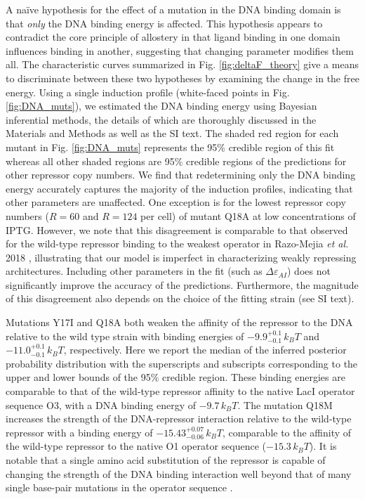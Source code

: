 A na\"{i}ve hypothesis for the effect of a mutation in the DNA binding domain is that
\textit{only} the DNA binding energy is affected. This hypothesis appears to
contradict the core principle of allostery in that ligand binding in one domain
influences binding in another, suggesting that changing
 parameter modifies them all. The characteristic curves summarized in Fig.
\ref{fig:deltaF_theory} give a means to  discriminate between these two
hypotheses by examining the change in the free energy. Using a single induction profile
(white-faced points in Fig. \ref{fig:DNA_muts}), we estimated the DNA binding
energy using Bayesian inferential methods, the details of which are thoroughly discussed in the Materials and Methods as
well as the SI text. The shaded red region for each mutant in Fig.
\ref{fig:DNA_muts} represents the 95\% credible region of this fit whereas
all other shaded regions are 95\% credible regions of the predictions for other repressor copy
numbers. We find that redetermining only the DNA binding energy accurately
captures the majority of the induction profiles, indicating that other parameters
are unaffected. One exception is for the lowest
repressor copy numbers ($R = 60$ and $R=124$ per cell) of mutant Q18A
at low concentrations of IPTG. However, we note that this disagreement is
comparable to that observed for the wild-type repressor binding to the weakest
operator in Razo-Mejia \textit{et al.} 2018 \cite{Razo-Mejia2018}, illustrating that
our model is imperfect in characterizing weakly repressing architectures.
Including other parameters in the fit (such as $\Delta\varepsilon_{AI}$) does
not significantly improve the accuracy of the predictions. Furthermore, the magnitude of
this disagreement also depends on the choice of the fitting strain (see SI
text).


Mutations Y17I and Q18A both weaken the affinity of the repressor to the DNA 
relative to the wild type strain with binding energies of $-9.9 ^{+0.1}_{-0.1}\, k_BT$ and
$-11.0^{+0.1}_{-0.1}\, k_BT$, respectively. Here we report the median of the
inferred posterior probability distribution with the superscripts and subscripts
corresponding to the upper and lower bounds of the 95\% credible region. 
These binding energies are comparable to that of the wild-type
repressor affinity to the native LacI operator sequence O3, with a DNA binding
energy of $-9.7\, k_BT$. The mutation Q18M increases the strength
of the DNA-repressor interaction relative to the wild-type repressor with a
binding energy of $-15.43^{+0.07}_{-0.06}\, k_BT$, comparable to the
affinity of the wild-type repressor to the native O1 operator sequence
($-15.3\, k_BT$). It is notable that a single amino acid substitution
of the repressor is capable of changing the strength of the DNA binding
interaction well beyond that of many single base-pair mutations in the operator
sequence \cite{Barnes2018, Garcia2011}.

